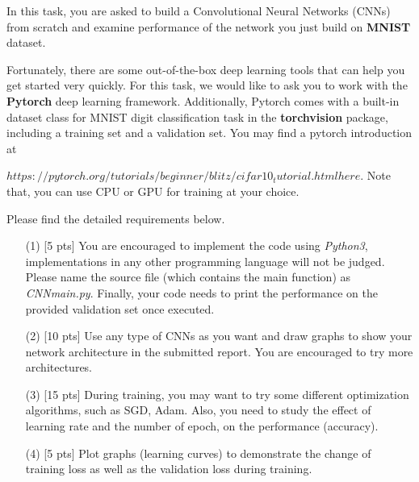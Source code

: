 \documentclass[11pt, a4paper, UTF8]{ctexart}
\begin{document}
\begin{problem}[ML problem 4]
	In this task, you are asked to build a Convolutional Neural Networks (CNNs) from scratch and examine performance of the network you just build on \textbf{MNIST} dataset.

Fortunately, there are some out-of-the-box deep learning tools that can help you get started very quickly. For this task, we would like to ask you to work with the \textbf{Pytorch} deep learning framework. Additionally, Pytorch comes with a built-in dataset class for MNIST digit classification task in the \textbf{torchvision} package, including a training set and a validation set. You may find a pytorch introduction at 


${https://pytorch.org/tutorials/beginner/blitz/cifar10_tutorial.html}{here}$. Note that, you can use CPU or GPU for training at your choice.

Please find the detailed requirements below.

\begin{enumerate}
	\item[(1)] [5 pts] You are encouraged to implement the code using \emph{Python3}, implementations in any other programming language will not be judged. Please name the source file (which contains the main function) as \emph{CNN\underline{\hspace{0.5em}}main.py}. Finally, your code needs to print the performance on the provided validation set once executed.
	
	\item[(2)] [10 pts] Use any type of CNNs as you want and draw graphs to show your network architecture in the submitted report. You are encouraged to try more architectures.
	
	\item [(3)] [15 pts] During training, you may want to try some different optimization algorithms, such as SGD, Adam. Also, you need to study the effect of learning rate and the number of epoch, on the performance (accuracy).
	
	\item [(4)] [5 pts] Plot graphs (learning curves) to demonstrate the change of training loss as well as the validation loss during training.
\end{enumerate}
\end{problem}
\end{document}
